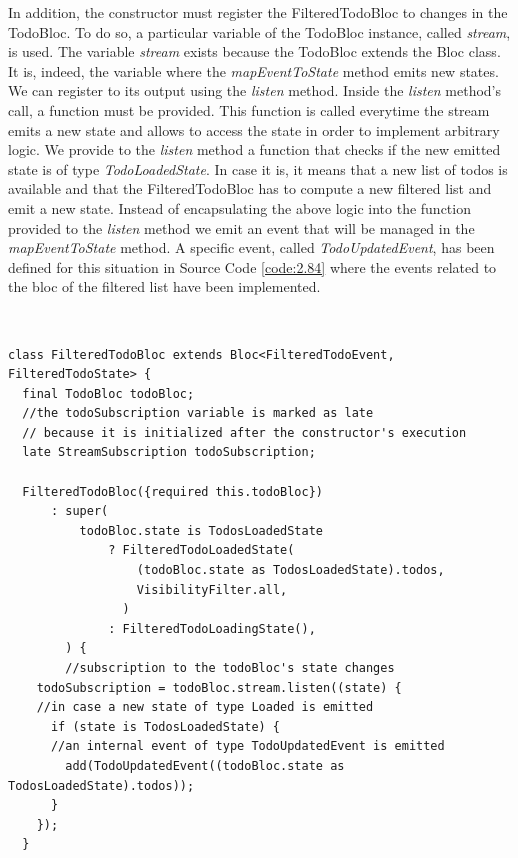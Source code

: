 In addition, the constructor must register the FilteredTodoBloc to changes in the TodoBloc. To do so,  a particular variable of the TodoBloc instance,  called \textit{stream}, is used. The variable \textit{stream} exists because the TodoBloc extends the Bloc class. It is,  indeed, the variable where the \textit{mapEventToState} method emits new states. We can register to its output using the \textit{listen} method. Inside the \textit{listen} method’s call, a function must be provided. This function is called everytime the stream emits a new state and allows to access the state in order to implement arbitrary logic. We provide to the \textit{listen} method a function that checks if the new emitted state is of type \textit{TodoLoadedState}. In case it is, it means that a new list of todos is available and that the FilteredTodoBloc has to compute a new filtered list and emit a new state. Instead of encapsulating the above logic into the function provided to the \textit{listen} method we emit an event that will be managed in the \textit{mapEventToState} method. A specific event, called \textit{TodoUpdatedEvent}, has been defined for this situation in Source Code \ref{code:2.84} where the events related to the bloc of the filtered list have been implemented.
\begin{code}
\mbox{}\\
 \mbox{}
\label{code:2.14}
\begin{verbatim}
class FilteredTodoBloc extends Bloc<FilteredTodoEvent, FilteredTodoState> {
  final TodoBloc todoBloc;
  //the todoSubscription variable is marked as late
  // because it is initialized after the constructor's execution
  late StreamSubscription todoSubscription;

  FilteredTodoBloc({required this.todoBloc})
      : super(
          todoBloc.state is TodosLoadedState
              ? FilteredTodoLoadedState(
                  (todoBloc.state as TodosLoadedState).todos,
                  VisibilityFilter.all,
                )
              : FilteredTodoLoadingState(),
        ) {
        //subscription to the todoBloc's state changes
    todoSubscription = todoBloc.stream.listen((state) {
    //in case a new state of type Loaded is emitted
      if (state is TodosLoadedState) {
      //an internal event of type TodoUpdatedEvent is emitted
        add(TodoUpdatedEvent((todoBloc.state as TodosLoadedState).todos));
      }
    });
  }
\end{verbatim}
\mbox{}
\end{code}

